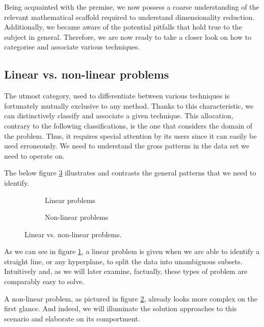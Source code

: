 Being acquainted with the premise, we now possess a coarse understanding of the relevant mathematical scaffold required to understand dimensionality reduction.
Additionally, we became aware of the potential pitfalls that hold true to the subject in general.
Therefore, we are now ready to take a closer look on how to categorise and associate various techniques.


\subsection{Linear vs. non-linear problems}

The utmost category, used to differentiate between various techniques is fortunately mutually exclusive to any method.
Thanks to this characteristic, we can distinctively classify and associate a given technique.
This allocation, contrary to the following classifications, is the one that considers the domain of the problem.
Thus, it requires special attention by its users since it can easily be used erroneously.
We need to understand the gross patterns in the data set we need to operate on.

The below figure \ref{fig:linearvsnonlinearproblems} illustrates and contrasts the general patterns that we need to identify.\vspace*{4mm}

\renewcommand{\tikzscale}{1.25}
\begin{figure}[h]
	\begin{subfigure}{0.48\textwidth}
	    \caption{Linear problems}
		
	    \label{subfig:linearproblems}
	\end{subfigure}
	\hfill
	\begin{subfigure}{0.48\textwidth}
	    \caption{Non-linear problems}
		
	    \label{subfig:nonlinearproblems}
	\end{subfigure}
\caption{Linear vs. non-linear problems.}
\label{fig:linearvsnonlinearproblems}
\end{figure}

As we can see in figure \ref{subfig:linearproblems}, a linear problem is given when we are able to identify a straight line, or any \gls{hyperplane}, to split the data into unambiguous subsets.
Intuitively and, as we will later examine, factually, these types of problem are comparably easy to solve.

A non-linear problem, as pictured in figure \ref{subfig:nonlinearproblems}, already looks more complex on the first glance.
And indeed, we will illuminate the solution approaches to this scenario and elaborate on its comportment.

